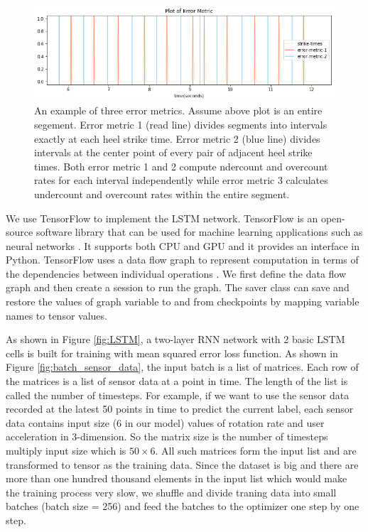 \documentclass[11pt]{article}
\begin{document}
{\begin{figure}[ht]
\centering
\includegraphics[scale=0.6]{error_metric}
\caption{An example of three error metrics. Assume above plot is an entire segement. Error metric 1 (read line) divides segments into intervals exactly at each heel strike time. Error metric 2 (blue line) divides intervals at the center point of every pair of adjacent heel strike times. Both error metric 1 and 2 compute ndercount and overcount rates for each interval independently while error metric 3 calculates undercount and overcount rates within the entire segment.}
\label{fig:error_metric}
\end{figure}

We use TensorFlow to implement the LSTM network. TensorFlow is an open-source software library that can be used for machine learning applications such as neural networks \cite{wiki:tensorflow}. It supports both CPU and GPU and it provides an interface in Python. TensorFlow uses a data flow graph to represent computation in terms of the dependencies between individual operations \cite{tensorflow.org}. We first define the data flow graph and then create a session to run the graph. The saver class can save and restore the values of graph variable to and from checkpoints by mapping variable names to tensor values.

As shown in Figure \ref{fig:LSTM}, a two-layer RNN network with 2 basic LSTM cells is built for training with mean squared error loss function. 
As shown in Figure \ref{fig:batch_sensor_data}, the input batch is a list of matrices. Each row of the matrices is a list of sensor data at a point in time. The length of the list is called the number of timesteps.
For example, if we want to use the sensor data recorded at the latest 50 points in time to predict the current label, each sensor data contains input size ($6$ in our model) values of rotation rate and user acceleration in 3-dimension. So the matrix size is the number of timesteps multiply input size which is $50 \times 6$. All such matrices form the input list and are transformed to tensor as the training data. Since the dataset is big and there are more than one hundred thousand elements in the input list which would make the training process very slow, we shuffle and divide traning data into small batches (batch size = 256) and feed the batches to the optimizer one step by one step.

}
\end{document}
